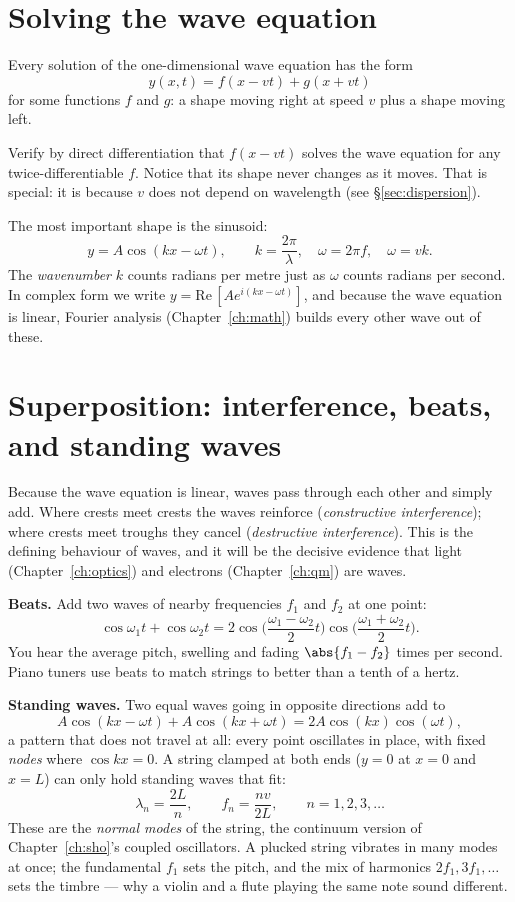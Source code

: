 \section{Solving the wave equation}

\begin{theorem}
Every solution of the one-dimensional wave equation has the form
\[
  y(x,t) = f(x - vt) + g(x+vt)
\]
for some functions $f$ and $g$: a shape moving right at speed $v$ plus a shape moving left.
\end{theorem}
\begin{exercise}
Verify by direct differentiation that $f(x-vt)$ solves the wave equation for any twice-differentiable $f$. Notice that its shape never changes as it moves. That is special: it is because $v$ does not depend on wavelength (see \S\ref{sec:dispersion}).
\end{exercise}

The most important shape is the sinusoid:
\[
  y = A\cos(kx - \omega t),\qquad k = \frac{2\pi}{\lambda},\quad \omega = 2\pi f, \quad \omega = vk .
\]
The \emph{wavenumber} $k$ counts radians per metre just as $\omega$ counts radians per second. In complex form we write $y = \mathrm{Re}\,[A e^{i(kx-\omega t)}]$, and because the wave equation is linear, Fourier analysis (Chapter~\ref{ch:math}) builds every other wave out of these.

\section{Superposition: interference, beats, and standing waves}

Because the wave equation is linear, waves pass through each other and simply add. Where crests meet crests the waves reinforce (\emph{constructive interference}); where crests meet troughs they cancel (\emph{destructive interference}). This is the defining behaviour of waves, and it will be the decisive evidence that light (Chapter~\ref{ch:optics}) and electrons (Chapter~\ref{ch:qm}) are waves.

\textbf{Beats.} Add two waves of nearby frequencies $f_1$ and $f_2$ at one point:
\[
  \cos\omega_1t + \cos\omega_2 t = 2\cos\!\Big(\frac{\omega_1-\omega_2}{2}t\Big)\cos\!\Big(\frac{\omega_1+\omega_2}{2}t\Big).
\]
You hear the average pitch, swelling and fading $\abs{f_1 - f_2}$ times per second. Piano tuners use beats to match strings to better than a tenth of a hertz.

\textbf{Standing waves.} Two equal waves going in opposite directions add to
\[
  A\cos(kx-\omega t) + A\cos(kx+\omega t) = 2A\cos(kx)\cos(\omega t),
\]
a pattern that does not travel at all: every point oscillates in place, with fixed \emph{nodes} where $\cos kx=0$. A string clamped at both ends ($y=0$ at $x=0$ and $x=L$) can only hold standing waves that fit:
\[
  \lambda_n = \frac{2L}{n},\qquad f_n = \frac{nv}{2L},\qquad n=1,2,3,\dots
\]
These are the \emph{normal modes} of the string, the continuum version of Chapter~\ref{ch:sho}'s coupled oscillators. A plucked string vibrates in many modes at once; the fundamental $f_1$ sets the pitch, and the mix of harmonics $2f_1, 3f_1,\dots$ sets the timbre --- why a violin and a flute playing the same note sound different.

